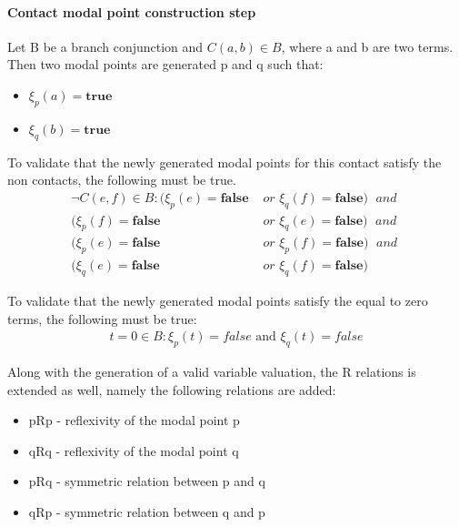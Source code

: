 \documentclass{article}
\newcommand{\vBool}{\xi}
\begin{document}
	\paragraph{Contact modal point construction step}\label{def-contacts-construction}
		Let B be a branch conjunction and $C(a, b) \in B$, where a and b are two terms. Then two modal points are generated p and q such that:
		\begin{itemize}
			\item $\vBool_{p}(a) = \textbf{true}$
			\item $\vBool_{q}(b) = \textbf{true}$
		\end{itemize}
		To validate that the newly generated modal points for this contact satisfy the non contacts, the following must be true.
		\begin{align*}
			 \neg C(e, f) \in B: (\vBool_{p}(e) = \textbf{false} & \textit{ or } \vBool_{q}(f) = \textbf{false}) \; \textit{ and } \\
				(\vBool_{p}(f) = \textbf{false} & \textit{ or } \vBool_{q}(e) = \textbf{false}) \; \textit{ and } \\
				(\vBool_{p}(e) = \textbf{false} & \textit{ or } \vBool_{p}(f) = \textbf{false}) \; \textit{ and } \\
				(\vBool_{q}(e) = \textbf{false} & \textit{ or } \vBool_{q}(f) = \textbf{false})
		\end{align*}

	To validate that the newly generated modal points satisfy the equal to zero terms, the following must be true:
	\begin{align*}
		t = 0 \in B: \vBool_{p}(t) = \textit{false} \text{ and }  \vBool_{q}(t) = \textit{false}
	\end{align*}

	Along with the generation of a valid variable valuation, the R relations is extended as well, namely the following relations are added:
	\begin{itemize}
		\item pRp - reflexivity of the modal point p
		\item qRq - reflexivity of the modal point q
		\item pRq - symmetric relation between p and q
		\item qRp - symmetric relation between q and p
	\end{itemize}
\end{document}
